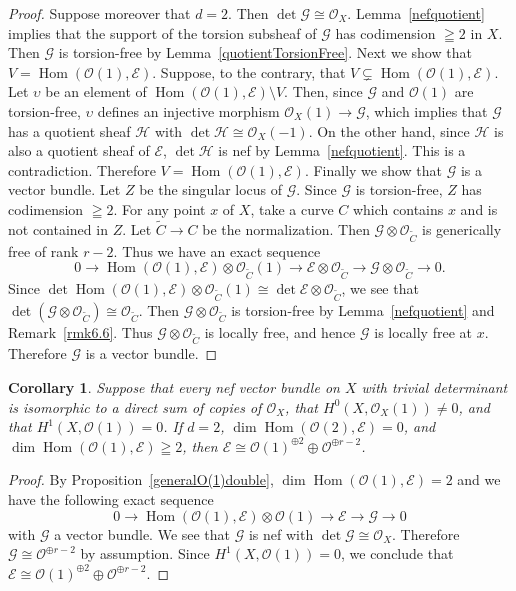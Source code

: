 \documentclass[a4paper,12pt]{amsart}
\newtheorem{cor}[thm]{Corollary}%
\DeclareMathOperator{\Hom}{Hom}
\begin{document}
\begin{proof}
Suppose moreover that $d=2$. Then $\det\mathcal{G}\cong \mathcal{O}_X$.
Lemma~\ref{nefquotient} implies 
that the support of the torsion subsheaf of $\mathcal{G}$
has codimension $\geqq 2$ in $X$.
Then $\mathcal{G}$ is torsion-free  by Lemma~\ref{quotientTorsionFree}.
Next we show that $V=\Hom(\mathcal{O}(1),\mathcal{E})$.
Suppose, to the contrary, that $V\subsetneq \Hom(\mathcal{O}(1),\mathcal{E})$.
Let $\upsilon$ be an element of $\Hom(\mathcal{O}(1),\mathcal{E})\setminus V$.
Then, since $\mathcal{G}$ and $\mathcal{O}(1)$ are torsion-free,
$\upsilon$ defines an injective morphism $\mathcal{O}_X(1)\to \mathcal{G}$,
which implies that $\mathcal{G}$ has a quotient sheaf $\mathcal{H}$ with $\det\mathcal{H}\cong \mathcal{O}_X(-1)$.
On the other hand, since $\mathcal{H}$ is also a quotient sheaf of $\mathcal{E}$,
$\det\mathcal{H}$ is nef by Lemma~\ref{nefquotient}. This is a contradiction. Therefore 
$V=\Hom(\mathcal{O}(1),\mathcal{E})$.
Finally we show that $\mathcal{G}$ is a vector bundle.
Let $Z$ be the singular locus of $\mathcal{G}$. Since $\mathcal{G}$ is torsion-free,
$Z$ has codimension $\geqq 2$.
For any point $x$ of $X$, take a curve $C$ which contains $x$ and is not contained in $Z$.
Let $\tilde{C}\to C$ be the normalization.
Then $\mathcal{G}\otimes \mathcal{O}_{\tilde{C}}$ is generically free of rank $r-2$.
Thus we have an exact sequence
\[0\to \Hom(\mathcal{O}(1),\mathcal{E})\otimes \mathcal{O}_{\tilde{C}}(1)\to \mathcal{E}\otimes\mathcal{O}_{\tilde{C}}
\to \mathcal{G}\otimes\mathcal{O}_{\tilde{C}}\to 0.\]
Since $\det \Hom(\mathcal{O}(1),\mathcal{E})\otimes \mathcal{O}_{\tilde{C}}(1)
\cong \det \mathcal{E}\otimes\mathcal{O}_{\tilde{C}}$, we see that $\det(\mathcal{G}\otimes\mathcal{O}_{\tilde{C}})\cong 
\mathcal{O}_{\tilde{C}}$.
Then $\mathcal{G}\otimes\mathcal{O}_{\tilde{C}}$ is torsion-free by Lemma~\ref{nefquotient} and Remark~\ref{rmk6.6}.
Thus $\mathcal{G}\otimes\mathcal{O}_{\tilde{C}}$ is locally free,
and hence  $\mathcal{G}$ is locally free at $x$.
Therefore $\mathcal{G}$ is a vector bundle.
\end{proof}

\begin{cor}\label{O(1)double}
Suppose 
that 
every nef vector bundle on $X$
with 
trivial determinant 
is isomorphic to a direct sum of copies of $\mathcal{O}_X$,
that 
$H^0(X,\mathcal{O}_X(1))\neq 0$,
and 
that $H^1(X,\mathcal{O}(1))=0$.
If $d=2$, $\dim \Hom(\mathcal{O}(2), \mathcal{E})=0$,
and 
$\dim \Hom(\mathcal{O}(1),\mathcal{E})\geqq 2$,
then 
$\mathcal{E}\cong \mathcal{O}(1)^{\oplus 2}\oplus \mathcal{O}^{\oplus r-2}$.
\end{cor}
\begin{proof}
By Proposition~\ref{generalO(1)double}, $\dim \Hom(\mathcal{O}(1),\mathcal{E})=2$
and we have the following exact sequence 
\[0\to 
\Hom(\mathcal{O}(1),\mathcal{E})
\otimes \mathcal{O}(1)\to \mathcal{E}\to \mathcal{G}\to 0\]
with $\mathcal{G}$ a vector bundle.
We see that 
$\mathcal{G}$ is nef with $\det\mathcal{G}\cong \mathcal{O}_X$.
Therefore $\mathcal{G}\cong \mathcal{O}^{\oplus r-2}$ by assumption.
Since $H^1(X,\mathcal{O}(1))=0$, we conclude that $\mathcal{E}\cong \mathcal{O}(1)^{\oplus 2}\oplus \mathcal{O}^{\oplus r-2}$.
\end{proof}
\end{document}
